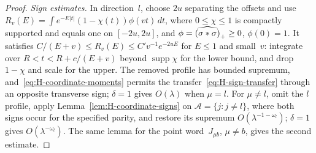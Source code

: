 \begin{proof}
\emph{Sign estimates.} In direction~$l$, choose $2u$ separating the offsets and use $R_v(E)=\int e^{-E|t|}(1-\chi(t))\phi(vt)\,dt$, where $0\le\chi\le1$ is compactly supported and equals one on $[-2u,2u]$, and $\phi=\widehat{(\sigma*\sigma)}_{+}\ge0$, $\phi(0)=1$. It satisfies $C/(E+v)\le R_v(E)\le C'v^{-1}e^{-2uE}$ for $E\le1$ and small~$v$: integrate over $R<t<R+c/(E+v)$ beyond $\operatorname{supp}\chi$ for the lower bound, and drop $1-\chi$ and scale for the upper. The removed profile has bounded supremum, and~\eqref{eq:H-coordinate-moments} permits the transfer~\eqref{eq:H-sign-transfer} through an opposite transverse sign; $\delta=1$ gives $O(\lambda)$ when $\mu=l$. For $\mu\ne l$, omit the $l$ profile, apply Lemma~\ref{lem:H-coordinate-signs} on $\mathcal A=\{j:j\ne l\}$, where both signs occur for the specified parity, and restore its supremum $O(\lambda^{-1-\omega_l})$; $\delta=1$ gives $O(\lambda^{-\omega_l})$. The same lemma for the point word~$J_{\mu b}$, $\mu\ne b$, gives the second estimate.


\end{proof}
